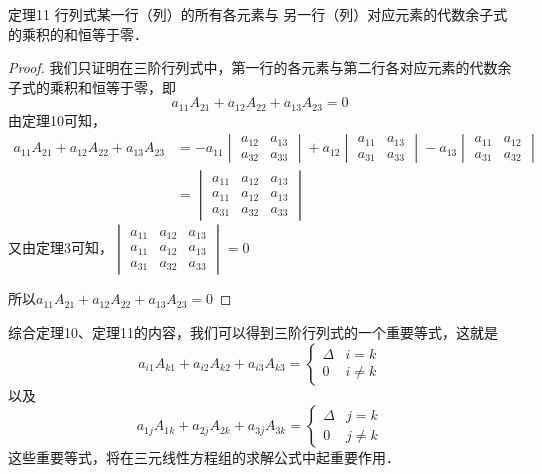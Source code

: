 \begin{blk}{定理11}
    行列式某一行（列）的所有各元素与 另一行（列）对应元素的代数余子式的乘积的和恒等于零．
\end{blk}

\begin{proof}
    我们只证明在三阶行列式中，第一行的各元素与第二行各对应元素的代数余子式的乘积和恒等于零，即
\[a_{11}A_{21}+a_{12}A_{22}+a_{13}A_{23}=0\]
由定理10可知，
\[\begin{split}
    a_{11}A_{21}+a_{12}A_{22}+a_{13}A_{23}
&=-a_{11}\begin{vmatrix}
    a_{12}&a_{13}\\a_{32}&a_{33}
\end{vmatrix}+a_{12}\begin{vmatrix}
    a_{11}&a_{13}\\a_{31}&a_{33}
\end{vmatrix}-a_{13}\begin{vmatrix}
    a_{11}&a_{12}\\a_{31}&a_{32}
\end{vmatrix}\\
&=\begin{vmatrix}
  a_{11}&  a_{12}&a_{13}\\a_{11}&  a_{12}&a_{13} \\a_{31}&a_{32}&a_{33}
\end{vmatrix}
\end{split}\]
又由定理3可知，$\begin{vmatrix}
    a_{11}&  a_{12}&a_{13}\\a_{11}&  a_{12}&a_{13} \\a_{31}&a_{32}&a_{33}
  \end{vmatrix}=0$
  
  所以$a_{11}A_{21}+a_{12}A_{22}+a_{13}A_{23}=0$
\end{proof}

综合定理10、定理11的内容，我们可以得到三阶行列式的一个重要等式，这就是
\[a_{i1}A_{k1}+a_{i2}A_{k2}+a_{i3}A_{k3}=\begin{cases}
    \Delta & i=k\\
    0 & i\ne k
\end{cases}\]
以及
\[a_{1j}A_{1k}+a_{2j}A_{2k}+a_{3j}A_{3k}=\begin{cases}
    \Delta & j=k\\
    0 & j\ne k
\end{cases}\]
这些重要等式，将在三元线性方程组的求解公式中起重要作用．

